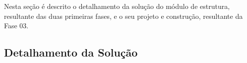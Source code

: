 \label{desenvolvimento_estrutura}
Nesta seção é descrito o detalhamento da solução do módulo de estrutura, resultante das duas primeiras fases,
e o seu projeto e construção, resultante da Fase 03.

\subsection{Detalhamento da Solução}







